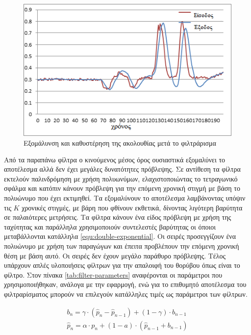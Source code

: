\begin{figure}[H]
    \centering
    \includegraphics[width=.8\textwidth, keepaspectratio]{fig/filter-latency.png}
    \caption{Εξομάλυνση και καθυστέρηση της ακολουθίας μετά το φιλτράρισμα\protect\footnotemark}
    \label{fig:filter-latency}
\end{figure}

Από τα παραπάνω φίλτρα ο κινούμενος μέσος όρος ουσιαστικά εξομαλύνει το αποτέλεσμα αλλά δεν έχει μεγάλες δυνατότητες πρόβλεψης. Σε αντίθεση τα φίλτρα  εκτελούν παλινδρόμηση με χρήση πολυωνύμων, ελαχιστοποιώντας το τετραγωνικό σφάλμα και κατόπιν κάνουν πρόβλεψη για την επόμενη χρονική στιγμή με βάση το πολυώνυμο που έχει εκτιμηθεί. Τα  εξομαλύνουν το αποτέλεσμα λαμβάνοντας υπόψιν τις $Κ$ χρονικές στιγμές, με βάρη που φθίνουν εκθετικά, δίνοντας λιγότερη βαρύτητα σε παλαιότερες μετρήσεις. Τα  φίλτρα κάνουν ένα είδος πρόβλεψη με χρήση της ταχύτητας και παράλληλα χρησιμοποιούν συντελεστές βαρύτητας οι όποιοι μεταβάλλονται κατάλληλα \ref{equ:double-exponential}. Οι σειρές  προσεγγίζουν ένα πολυώνυμο με χρήση των παραγώγων και έπειτα προβλέπουν την επόμενη χρονική θέση με βάση αυτό. Οι σειρές  δεν έχουν μεγάλο παράθυρο πρόβλεψης. Τέλος υπάρχουν απλές υλοποιήσεις φίλτρων για την απαλοιφή του θορύβου όπως είναι το  φίλτρο. Στον πίνακα \ref{tab:filter-parameters} αναφέρονται οι παράμετροι που χρησιμοποιήθηκαν, ανάλογα με την εφαρμογή, ενώ για το επιθυμητό αποτέλεσμα του φιλτραρίσματος μπορούν να επιλεγούν κατάλληλες τιμές ως παράμετροι των φίλτρων.

\begin{equation}
    \begin{aligned}
        b_{n} = \gamma \cdot (\hat{p}_{n} - \hat{p}_{n-1}) + (1 - \gamma) \cdot b_{n-1}\\[10pt]
        \hat{p}_{n} = \alpha \cdot p_{n} + (1 - a) \cdot (\hat{p}_{n-1} + b_{n-1})
    \end{aligned}
    \label{equ:double-exponential}
\end{equation}

